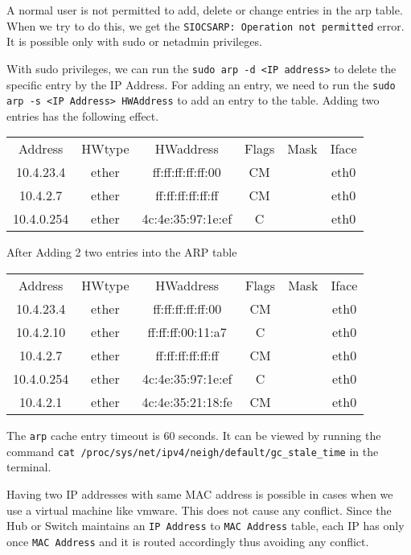 \documentclass{article}
\begin{document}
A normal user is not permitted to add, delete or change entries in the arp table. When we try to do this, we get the \texttt{SIOCSARP: Operation not permitted} error. It is possible only with sudo or netadmin privileges. 

With sudo privileges, we can run the \texttt{sudo arp -d <IP address>} to delete the specific entry by the IP Address. For adding an entry, we need to run the \texttt{sudo arp -s <IP Address> HWAddress} to add an entry to the table. Adding two entries has the following effect.

{\footnotesize
\begin{center}
\begin{tabular}{ |c|c|c|c|c|c| } 
 \hline
Address	&    HWtype & HWaddress &   Flags & Mask &	Iface\\
10.4.23.4  & ether &  ff:ff:ff:ff:ff:00 &    CM & & eth0  \\
10.4.2.7  &  ether & ff:ff:ff:ff:ff:ff &  CM & & eth0 \\
10.4.0.254	& ether & 4c:4e:35:97:1e:ef & C & & eth0\\
 \hline
\end{tabular}
\end{center}
}
After Adding 2 two entries into the ARP table\\
{ \footnotesize
\begin{center}
\begin{tabular}{ |c|c|c|c|c|c| } 
 \hline
Address	&    HWtype & HWaddress &   Flags & Mask &	Iface\\
10.4.23.4  & ether &  ff:ff:ff:ff:ff:00 &    CM & & eth0  \\
10.4.2.10 &  ether &  ff:ff:ff:00:11:a7 & C	& & eth0 \\
10.4.2.7  &  ether & ff:ff:ff:ff:ff:ff &  CM & & eth0 \\
10.4.0.254	& ether & 4c:4e:35:97:1e:ef & C & & eth0\\
10.4.2.1 &  ether & 4c:4e:35:21:18:fe & CM & & eth0\\
 \hline
\end{tabular}
\end{center}
}

The \texttt{arp} cache entry timeout is 60 seconds. It can be viewed by running the command \texttt{cat /proc/sys/net/ipv4/neigh/default/gc\_stale\_time} in the terminal. 


Having two IP addresses with same MAC address is possible in cases when we use a virtual machine like vmware. This does not cause any conflict. Since the Hub or Switch maintains an \texttt{IP Address} to \texttt{MAC Address} table, each IP has only once \texttt{MAC Address} and it is routed accordingly thus avoiding any conflict.
\end{document}
